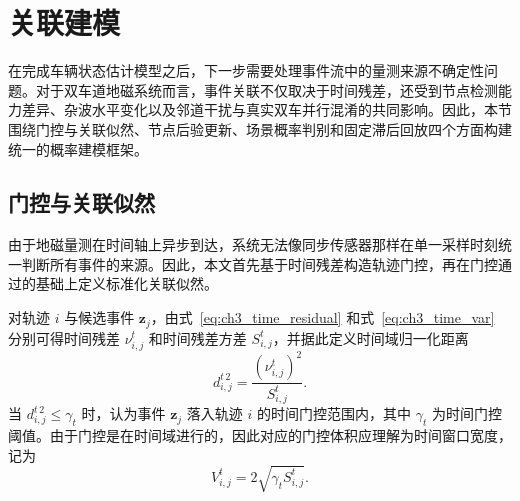\documentclass{xdupgthesis}
\begin{document}
\section{关联建模}
\label{sec:ch3_association}

在完成车辆状态估计模型之后，下一步需要处理事件流中的量测来源不确定性问题。对于双车道地磁系统而言，事件关联不仅取决于时间残差，还受到节点检测能力差异、杂波水平变化以及邻道干扰与真实双车并行混淆的共同影响。因此，本节围绕门控与关联似然、节点后验更新、场景概率判别和固定滞后回放四个方面构建统一的概率建模框架。

\subsection{门控与关联似然}

由于地磁量测在时间轴上异步到达，系统无法像同步传感器那样在单一采样时刻统一判断所有事件的来源。因此，本文首先基于时间残差构造轨迹门控，再在门控通过的基础上定义标准化关联似然。

对轨迹 $i$ 与候选事件 $\mathbf z_j$，由式~\eqref{eq:ch3_time_residual} 和式~\eqref{eq:ch3_time_var} 分别可得时间残差 $\nu^{t}_{i,j}$ 和时间残差方差 $S^{t}_{i,j}$，并据此定义时间域归一化距离
\begin{equation}
	d^{t\,2}_{i,j}
	=
	\frac{\left(\nu^{t}_{i,j}\right)^2}{S^{t}_{i,j}}.
	\label{eq:ch3_time_maha_assoc}
\end{equation}
当 $d^{t\,2}_{i,j}\le \gamma_t$ 时，认为事件 $\mathbf z_j$ 落入轨迹 $i$ 的时间门控范围内，其中 $\gamma_t$ 为时间门控阈值。由于门控是在时间域进行的，因此对应的门控体积应理解为时间窗口宽度，记为
\begin{equation}
	V^{t}_{i,j}=2\sqrt{\gamma_t S^{t}_{i,j}}.
	\label{eq:ch3_gate_width_time}
\end{equation}
\end{document}
